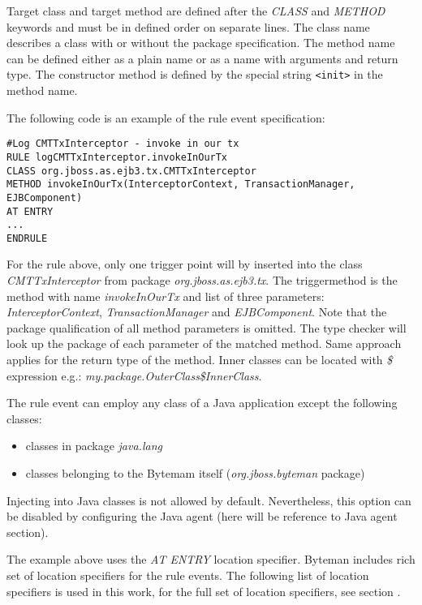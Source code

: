 \documentclass[12pt,oneside]{fithesis2}
\begin{document}
Target class and target method are defined after the \textit{CLASS} and \textit{METHOD} keywords and must be in defined order on separate lines. The class name describes a class with or without the package specification. The method name can be defined either as a plain name or as a name with arguments and return type. The constructor method is defined by the special string \verb|<init>| in the method name.

The following code is an example of the rule event specification:

\begin{lstlisting}[caption = Rule event specification, label = rule_event_code]
#Log CMTTxInterceptor - invoke in our tx
RULE logCMTTxInterceptor.invokeInOurTx
CLASS org.jboss.as.ejb3.tx.CMTTxInterceptor
METHOD invokeInOurTx(InterceptorContext, TransactionManager, EJBComponent)
AT ENTRY
...
ENDRULE
\end{lstlisting}

For the rule above, only one trigger point will by inserted into the class \textit{CMTTxInterceptor} from package \textit{org.jboss.as.ejb3.tx}. The triggermethod is the method with name \textit{invokeInOurTx} and list of three parameters: \textit{InterceptorContext}, \textit{TransactionManager} and \textit{EJBComponent}. Note that the package qualification of all method parameters is omitted. The type checker will look up the package of each parameter of the matched method. Same approach applies for the return type of the method. Inner classes can be located with \textit{\$} expression e.g.: \textit{my.package.OuterClass\$InnerClass}.

The rule event can employ any class of a Java application except the following classes:

\begin{itemize}
   \item classes in package \textit{java.lang}
   \item classes belonging to the Bytemam itself (\textit{org.jboss.byteman} package)
\end{itemize}

Injecting into Java classes is not allowed by default. Nevertheless, this option can be disabled by configuring the Java agent (here will be reference to Java agent section).

The example above uses the \textit{AT ENTRY} location specifier. Byteman includes rich set of location specifiers for the rule events. The following list of location specifiers is used in this work, for the full set of location specifiers, see section \cite[Location Specifiers]{byteman_doc}.
\end{document}
